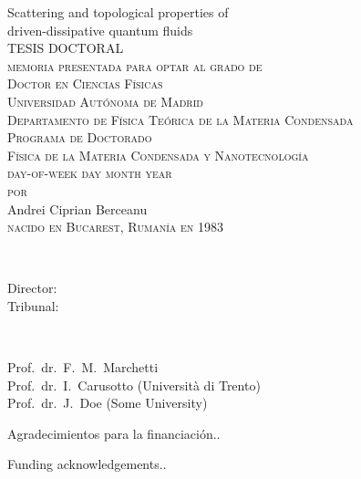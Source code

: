 \thispagestyle{empty}

\begin{center}
{\Huge  Scattering and topological properties of \\ driven-dissipative quantum fluids\\}
\vspace{5.4cm}
{\large{TESIS DOCTORAL}}\\
\vspace{2.6cm}
{ \textsc{memoria presentada para optar al grado de \\ Doctor en Ciencias F\'{i}sicas\\
Universidad Aut\'{o}noma de Madrid\\
Departamento de F\'{i}sica Te\'{o}rica de la Materia Condensada\\
Programa de Doctorado\\
F\'{i}sica de la Materia Condensada y Nanotecnolog\'{i}a\\
day-of-week day month year\\
$\,$\\$\,$\\por\\$\,$\\$\,$\\}
{\LARGE{Andrei Ciprian Berceanu}}\\$\,$ \\\textsc{nacido en Bucarest, Ruman\'{i}a en 1983}}
\end{center}
\newpage

\thispagestyle{empty}
\\[2ex]
  \parbox[t]{2.8cm}{Director:\\
                  Tribunal:
}~\parbox[t]{9cm}{Prof.\ dr.\ F.\ M.\ Marchetti \\
Prof.\ dr.\ I.\ Carusotto (Universit\`{a} di Trento) \\
Prof.\ dr.\ J.\ Doe (Some University)
}


\vfill


\noindent
\begin{otherlanguage}{spanish}
Agradecimientos para la financiaci\'{o}n..
\end{otherlanguage}
\vspace{\baselineskip}


\noindent
Funding acknowledgements..
\vspace{\baselineskip}


